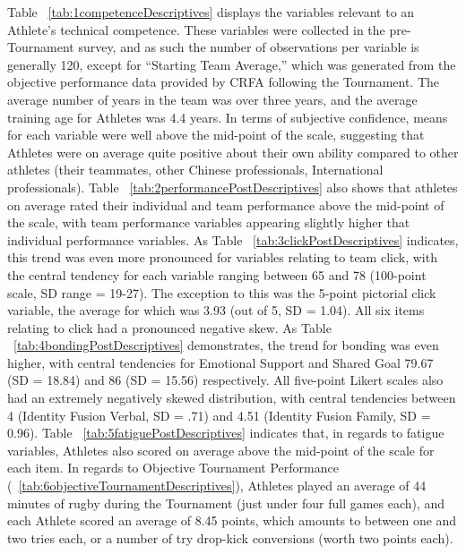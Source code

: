 Table ~\ref{tab:1competenceDescriptives} displays the variables relevant to an Athlete's technical competence.  These variables were collected in the pre-Tournament survey, and as such the number of observations per variable is generally 120, except for ``Starting Team Average,'' which was generated from the objective performance data provided by CRFA following the Tournament.  The average number of years in the team was over three years, and the average training age for Athletes was 4.4 years.  In terms of subjective confidence, means for each variable were well above the mid-point of the scale, suggesting that Athletes were on average quite positive about their own ability compared to other athletes (their teammates, other Chinese professionals, International professionals).  Table ~\ref{tab:2performancePostDescriptives} also shows that athletes on average rated their individual and team performance above the mid-point of the scale, with team performance variables appearing slightly higher that individual performance variables.  As Table ~\ref{tab:3clickPostDescriptives} indicates, this trend was even more pronounced for variables relating to team click, with the central tendency for each variable ranging between 65 and 78 (100-point scale, SD range =  19-27). The exception to this was the 5-point pictorial click variable, the average for which was 3.93 (out of 5, SD = 1.04).  All six items relating to click had a pronounced negative skew.  As Table ~\ref{tab:4bondingPostDescriptives} demonstrates, the trend for bonding was even higher, with central tendencies for Emotional Support and Shared Goal 79.67 (SD = 18.84) and 86 (SD = 15.56) respectively.  All five-point Likert scales also had an extremely negatively skewed distribution, with central tendencies between 4 (Identity Fusion Verbal, SD = .71) and 4.51 (Identity Fusion Family, SD = 0.96).  Table ~\ref{tab:5fatiguePostDescriptives} indicates that, in regards to fatigue variables, Athletes also scored on average above the mid-point of the scale for each item.  In regards to Objective Tournament Performance (~\ref{tab:6objectiveTournamentDescriptives}), Athletes played an average of 44 minutes of rugby during the Tournament (just under four full games each), and each Athlete scored an average of 8.45 points, which amounts to between one and two tries each, or a number of try drop-kick conversions (worth two points each).



\clearpage







